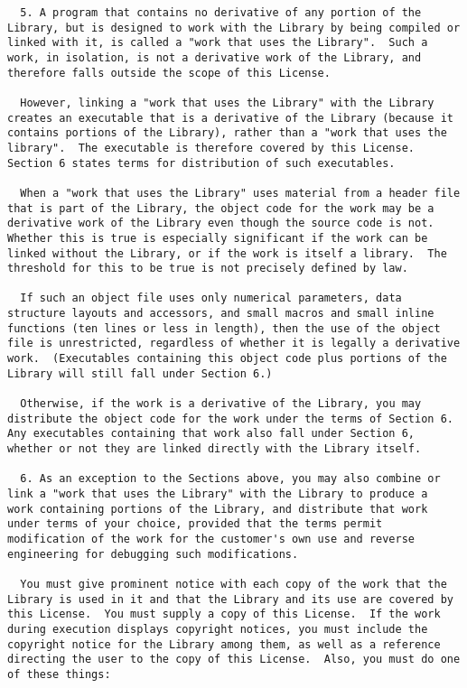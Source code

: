 \documentclass{InsightBook}
\begin{document}
\begin{verbatim}
  5. A program that contains no derivative of any portion of the
Library, but is designed to work with the Library by being compiled or
linked with it, is called a "work that uses the Library".  Such a
work, in isolation, is not a derivative work of the Library, and
therefore falls outside the scope of this License.

  However, linking a "work that uses the Library" with the Library
creates an executable that is a derivative of the Library (because it
contains portions of the Library), rather than a "work that uses the
library".  The executable is therefore covered by this License.
Section 6 states terms for distribution of such executables.

  When a "work that uses the Library" uses material from a header file
that is part of the Library, the object code for the work may be a
derivative work of the Library even though the source code is not.
Whether this is true is especially significant if the work can be
linked without the Library, or if the work is itself a library.  The
threshold for this to be true is not precisely defined by law.

  If such an object file uses only numerical parameters, data
structure layouts and accessors, and small macros and small inline
functions (ten lines or less in length), then the use of the object
file is unrestricted, regardless of whether it is legally a derivative
work.  (Executables containing this object code plus portions of the
Library will still fall under Section 6.)

  Otherwise, if the work is a derivative of the Library, you may
distribute the object code for the work under the terms of Section 6.
Any executables containing that work also fall under Section 6,
whether or not they are linked directly with the Library itself.

  6. As an exception to the Sections above, you may also combine or
link a "work that uses the Library" with the Library to produce a
work containing portions of the Library, and distribute that work
under terms of your choice, provided that the terms permit
modification of the work for the customer's own use and reverse
engineering for debugging such modifications.

  You must give prominent notice with each copy of the work that the
Library is used in it and that the Library and its use are covered by
this License.  You must supply a copy of this License.  If the work
during execution displays copyright notices, you must include the
copyright notice for the Library among them, as well as a reference
directing the user to the copy of this License.  Also, you must do one
of these things:


\end{verbatim}
\end{document}
